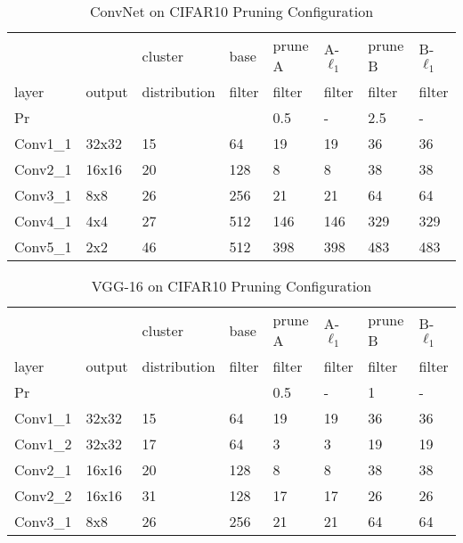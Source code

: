 \documentclass{article} %
\begin{document}
\begin{table}[h]
\caption{ConvNet on CIFAR10 Pruning Configuration}
\centering
\begin{tabular}{llllllll}
\toprule
                 &        & cluster & base   & prune A & A-$\ell_1$ & prune B & B-$\ell_1$	\\ 
layer            & output & distribution & filter & filter  & filter     & filter  & filter		\\ \midrule
Pr               &        &         &        & 0.5     & -       	& 2.5     & -			\\
Conv1\_1         & 32x32  & 15      & 64     & 19      & 19         & 36      & 36			\\
Conv2\_1         & 16x16  & 20      & 128    & 8       & 8        	& 38      & 38			\\
Conv3\_1         &  8x8   & 26      & 256    & 21      & 21        	& 64      & 64			\\
Conv4\_1         &  4x4   & 27      & 512    & 146     & 146       	& 329     & 329			\\
Conv5\_1         &  2x2   & 46      & 512    & 398     & 398     	& 483     & 483			\\ \bottomrule
\end{tabular}
\label{tab:ConvNet_app}
\end{table}\vspace{-2mm}\begin{table}[h]
\caption{VGG-16 on CIFAR10 Pruning Configuration}
\centering
\begin{tabular}{llllllll}
\toprule
                 &        &  cluster& base   & prune A & A-$\ell_1$ & prune B & B-$\ell_1$	\\ 
layer            & output & distribution& filter & filter  & filter     & filter  & filter		\\ \midrule
Pr               &        &         &        & 0.5     & -       	& 1       & -			\\ 
Conv1\_1         & 32x32  & 15      & 64     & 19      & 19         & 36      & 36			\\
Conv1\_2         & 32x32  & 17      & 64     & 3       & 3       	& 19      & 19			\\
Conv2\_1         & 16x16  & 20      & 128    & 8       & 8        	& 38      & 38			\\
Conv2\_2         & 16x16  & 31      & 128    & 17      & 17       	& 26      & 26			\\
Conv3\_1         &  8x8   & 26      & 256    & 21      & 21        	& 64      & 64			\\

\end{tabular}
\end{table}
\end{document}
